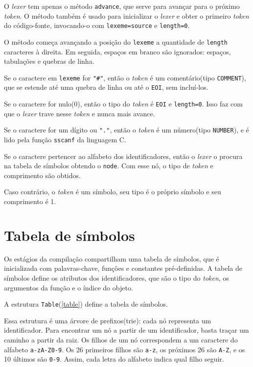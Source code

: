 O \textit{lexer} tem apenas o método \texttt{advance}, que serve para avançar
para o próximo \textit{token}. O método também é usado para inicializar o
\textit{lexer} e obter o primeiro \textit{token} do código-fonte,
invocando-o com \texttt{lexeme=source} e \texttt{length=0}.

O método começa avançando a posição do \texttt{lexeme} a quantidade de
\texttt{length} caracteres à direita.
Em seguida, espaços em branco são ignorados: espaços, tabulações e quebras de linha.

Se o caractere em \texttt{lexeme} for \texttt{"\#"}, então o \textit{token} é um
comentário(tipo \texttt{COMMENT}),
que se estende até uma quebra de linha ou até o \texttt{EOI}, sem incluí-los.

Se o caractere for nulo(0), então o tipo do \textit{token} é \texttt{EOI} e \texttt{length=0}.
Isso faz com que o \textit{lexer} trave nesse \textit{token} e nunca mais avance.

Se o caractere for um dígito ou \texttt{"."}, então o \textit{token} é um número(tipo \texttt{NUMBER}),
e é lido pela função \texttt{sscanf} da linguagem C.

Se o caractere pertencer ao alfabeto dos identificadores,
então o \textit{lexer} o procura na tabela de símbolos obtendo o \texttt{node}.
Com esse nó, o tipo de \textit{token} e comprimento são obtidos.

Caso contrário, o \textit{token} é um símbolo, seu tipo é o próprio símbolo
e seu comprimento é 1.

\newpage

\section{Tabela de símbolos}
Os estágios da compilação compartilham uma tabela de símbolos,
que é inicializada com palavras-chave,
funções e constantes pré-definidas.
A tabela de símbolos define os atributos dos identificadores,
que são o tipo do \textit{token}, os argumentos da função e o índice do objeto.

A estrutura \texttt{Table}(\ref{table}) define a tabela de símbolos.
\lstset{language=c++}

Essa estrutura é uma árvore de prefixos(trie):
cada nó representa um identificador. Para encontrar um nó a partir
de um identificador, basta traçar um caminho a partir da raiz.
Os filhos de um nó correspondem a um caractere do alfabeto \texttt{a-zA-Z0-9}.
Os 26 primeiros filhos são \texttt{a-z}, os próximos 26 são \texttt{A-Z},
e os 10 últimos são \texttt{0-9}.
Assim, cada letra do alfabeto indica qual filho seguir.

